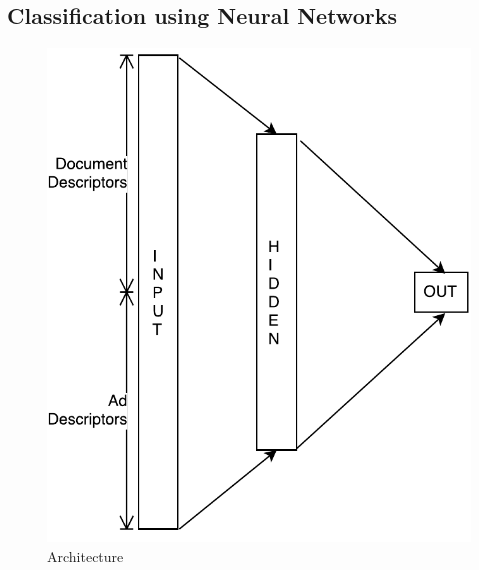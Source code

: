 \documentclass[fleqn,10pt]{SelfArx} %
\begin{document}

\subsection{Classification using Neural Networks}



\begin{figure}[h]
  \centering
      \includegraphics[scale=0.4]{Architecture}
\caption{Architecture}
\label{fig:architecture}
\end{figure}

\end{document}
